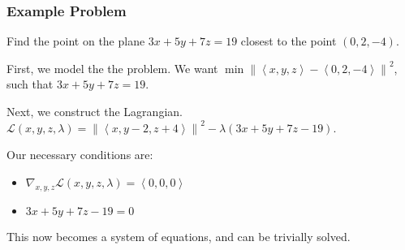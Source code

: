 \documentclass[12pt]{article}
\theoremstyle{plain} %
\theoremstyle{definition}
\theoremstyle{definition}
\theoremstyle{definition}
\theoremstyle{remark}
\newcommand{\Lagr}{\mathcal{L}}
\newcommand{\angled}[1]{\left\langle {#1} \right\rangle}
\renewcommand{\norm}[1]{\left\lVert#1\right\rVert}
\begin{document}
\subsubsection{Example Problem}
Find the point on the plane $3x+5y+7z=19$ closest to the point $\left( 0,2,-4 \right)$.

First, we model the the problem. We want $\min \norm{\angled{x,y,z}-\angled{0,2,-4}}^2$, such that $3x+5y+7z=19$.

Next, we construct the Lagrangian.
$\Lagr(x,y,z,\lambda) = \norm{\angled{x,y-2,z+4}}^2 - \lambda (3x+5y+7z-19)$.

Our necessary conditions are:
\begin{itemize}
    \item $\nabla_{x,y,z} \Lagr(x,y,z,\lambda) = \angled{0,0,0}$
    \item $3x+5y+7z-19=0$
\end{itemize}
This now becomes a system of equations, and can be trivially solved.
\end{document}
